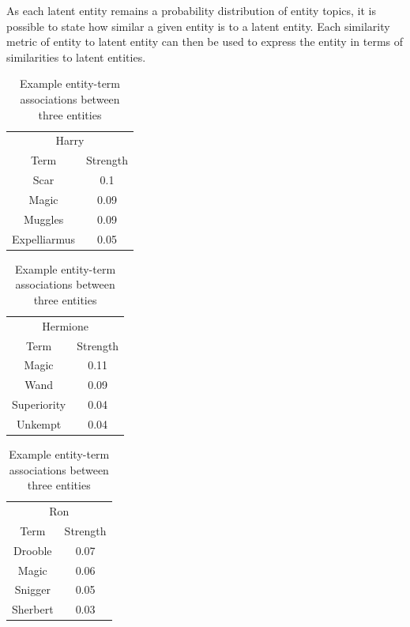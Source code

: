 \documentclass[10pt]{report}
\begin{document}
As each latent entity remains a probability distribution of entity topics, it is possible to state how similar a given entity is to a latent entity. Each similarity metric of entity to latent entity can then be used to express the entity in terms of similarities to latent entities.

\begin{table}[h!]
  \centering
  \begin{tabular}{*2c}
      \multicolumn{2}{c}{Harry}\\
      Term&Strength\\
      \hline
      Scar&0.1\\
      Magic&0.09\\
      Muggles&0.09\\
      Expelliarmus&0.05
    \end{tabular}              
    \begin{tabular}{*2c}
      \multicolumn{2}{c}{Hermione}\\
      Term&Strength\\
      \hline
      Magic&0.11\\
      Wand&0.09\\
      Superiority&0.04\\
      Unkempt&0.04      
    \end{tabular}
    \begin{tabular}{*2c}
      \multicolumn{2}{c}{Ron}\\
      Term&Strength\\
      \hline
      Drooble&0.07\\
      Magic&0.06\\
      Snigger&0.05\\
      Sherbert&0.03
    \end{tabular}
  \caption{Example entity-term associations between three entities\label{fig:example_entity_term_associations}}
\end{table}
\end{document}
